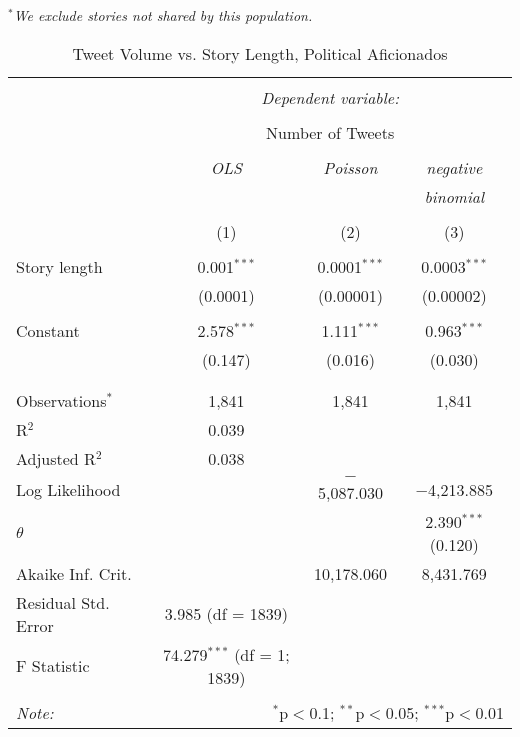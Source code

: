 \emph{$^{*}$We exclude stories not shared by this population.} 
\newpage 
\begin{table}[!htbp] \centering 
  \caption{Tweet Volume vs. Story Length, Political Aficionados} 
  \label{} 
    \begin{tabular}{@{\extracolsep{5pt}}lccc} 
    \\[-1.8ex]\hline 
    \hline \\[-1.8ex] 
     & \multicolumn{3}{c}{\textit{Dependent variable:}} \\ 
    \cline{2-4} 
    \\[-1.8ex] & \multicolumn{3}{c}{Number of Tweets} \\ 
    \\[-1.8ex] & \textit{OLS} & \textit{Poisson} & \textit{negative} \\ 
     & \textit{} & \textit{} & \textit{binomial} \\ 
    \\[-1.8ex] & (1) & (2) & (3)\\ 
    \hline \\[-1.8ex] 
     Story length & 0.001$^{***}$ & 0.0001$^{***}$ & 0.0003$^{***}$ \\ 
      & (0.0001) & (0.00001) & (0.00002) \\ 
      & & & \\ 
     Constant & 2.578$^{***}$ & 1.111$^{***}$ & 0.963$^{***}$ \\ 
      & (0.147) & (0.016) & (0.030) \\ 
      & & & \\ 
    \hline \\[-1.8ex] 
    Observations$^{*}$ & 1,841 & 1,841 & 1,841 \\ 
    R$^{2}$ & 0.039 &  &  \\ 
    Adjusted R$^{2}$ & 0.038 &  &  \\ 
    Log Likelihood &  & $-$5,087.030 & $-$4,213.885 \\ 
    $\theta$ &  &  & 2.390$^{***}$  (0.120) \\ 
    Akaike Inf. Crit. &  & 10,178.060 & 8,431.769 \\ 
    Residual Std. Error & 3.985 (df = 1839) &  &  \\ 
    F Statistic & 74.279$^{***}$ (df = 1; 1839) &  &  \\ 
    \hline 
    \hline \\[-1.8ex] 
    \textit{Note:}  & \multicolumn{3}{r}{$^{*}$p$<$0.1; $^{**}$p$<$0.05; $^{***}$p$<$0.01} \\ 
    \end{tabular} 
\end{table}
